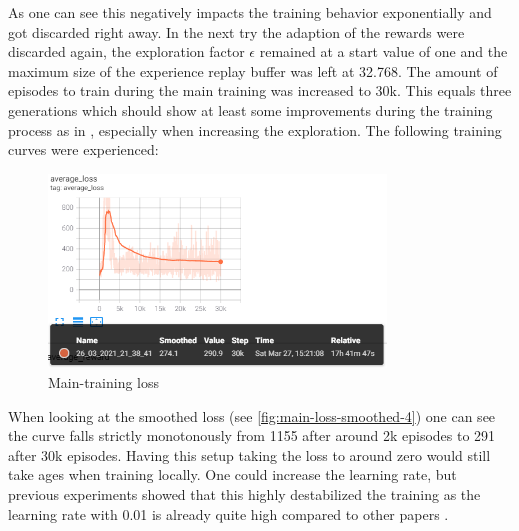 As one can see this negatively impacts the training behavior exponentially and got discarded right away. In the next try the adaption of the rewards were discarded again, the exploration factor $\epsilon$ remained at a start value of one and the maximum size of the experience replay buffer was left at 32.768. The amount of episodes to train during the main training was increased to 30k. This equals three generations which should show at least some improvements during the training process as in \cite{Kormelink2018}, especially when increasing the exploration. The following training curves were experienced: 

\begin{figure}[ht]
	\centering
	\includegraphics[width=0.8\textwidth]{figures/training4-main-loss-smooth.PNG}
	\caption{Main-training loss}
	\label{fig:main-loss-smoothed-4}
\end{figure}

When looking at the smoothed loss (see \autoref{fig:main-loss-smoothed-4}) one can see the curve falls strictly monotonously from 1155 after around 2k episodes to 291 after 30k episodes. Having this setup taking the loss to around zero would still take ages when training locally. One could increase the learning rate, but previous experiments showed that this highly destabilized the training as the learning rate with 0.01 is already quite high compared to other papers \cite{Franca2019, Kormelink2018}. 

\newpage

